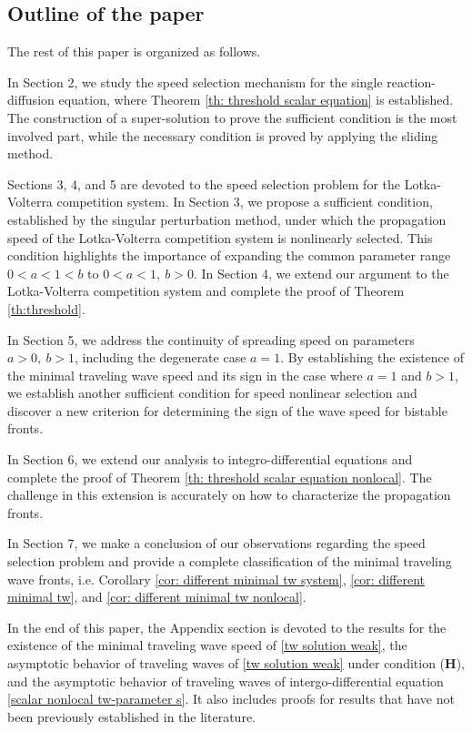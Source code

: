 \documentclass[11pt,a4paper]{article}
\numberwithin{equation}{section}
\numberwithin{figure}{section}
\begin{document}
\subsection{Outline of the paper}
The rest of this paper is organized as follows. 

In Section 2, we study the speed selection mechanism
for the single reaction-diffusion equation, where Theorem \ref{th: threshold scalar equation} is established. The construction of a super-solution to prove the sufficient condition is the most involved part, while the necessary condition is proved by applying the sliding method.

Sections 3, 4, and 5 are devoted to the speed selection problem for the Lotka-Volterra competition system.
In Section 3, we propose a sufficient condition, established by the singular perturbation method,  under which the propagation speed of the Lotka-Volterra competition system is nonlinearly selected.
This condition highlights the importance of expanding the common parameter range 
$0<a<1<b$ to $0<a<1,\ b>0$. 
In Section 4, we extend our argument to the Lotka-Volterra competition system and complete the proof of Theorem \ref{th:threshold}. 

In Section 5, we address the continuity of spreading speed on parameters $a>0,\ b>1$, including the degenerate case $a=1$. %
By establishing the existence of the minimal traveling wave speed and its sign in the case where $a=1$ and $b>1$, %
we establish another sufficient condition for speed nonlinear selection and discover a new criterion for determining the sign of the wave speed for bistable fronts.

In Section 6, we extend our analysis to integro-differential equations and complete the proof of Theorem \ref{th: threshold scalar equation nonlocal}. 
The challenge in this extension is accurately on how to characterize the propagation fronts.

In Section 7, we make a conclusion of our observations regarding the speed selection problem and provide a complete classification of the minimal traveling wave fronts, i.e. Corollary \ref{cor: different minimal tw system},  \ref{cor: different minimal tw}, and \ref{cor: different minimal tw nonlocal}.

In the end of this paper,
the Appendix section is devoted to the results for the existence of the minimal traveling wave speed
of \eqref{tw solution weak}, the asymptotic behavior of traveling waves of \eqref{tw solution weak} under condition ({\bf H}), and the asymptotic behavior of traveling waves of intergo-differential equation \eqref{scalar nonlocal tw-parameter s}.  It also includes
proofs for results that have not been previously established in the literature.
\end{document}
